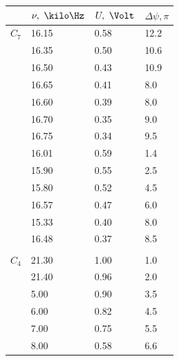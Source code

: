 \documentclass{report}
\begin{document}
\begin{enumerate}
	      \begin{table}[H]
		      \centering
		      \begin{tabular}{l|lll}
			              & $ \nu,\ \kilo\Hz $ & $ U,\ \Volt $ & $\Delta \psi, \pi$ \\
			      \hline
			      $ C_7 $ & 16.15              & 0.58          & 12.2               \\
			              & 16.35              & 0.50          & 10.6               \\
			              & 16.50              & 0.43          & 10.9               \\
			              & 16.65              & 0.41          & 8.0                \\
			              & 16.60              & 0.39          & 8.0                \\
			              & 16.70              & 0.35          & 9.0                \\
			              & 16.75              & 0.34          & 9.5                \\
			              & 16.01              & 0.59          & 1.4                \\
			              & 15.90              & 0.55          & 2.5                \\
			              & 15.80              & 0.52          & 4.5                \\
			              & 16.57              & 0.47          & 6.0                \\
			              & 15.33              & 0.40          & 8.0                \\
			              & 16.48              & 0.37          & 8.5                \\
			              &                    &               &                    \\
			      $ C_4 $ & 21.30              & 1.00          & 1.0                \\
			              & 21.40              & 0.96          & 2.0                \\
			              & 5.00               & 0.90          & 3.5                \\
			              & 6.00               & 0.82          & 4.5                \\
			              & 7.00               & 0.75          & 5.5                \\
			              & 8.00               & 0.58          & 6.6                \\

\end{tabular}
\end{table}
\end{enumerate}
\end{document}
